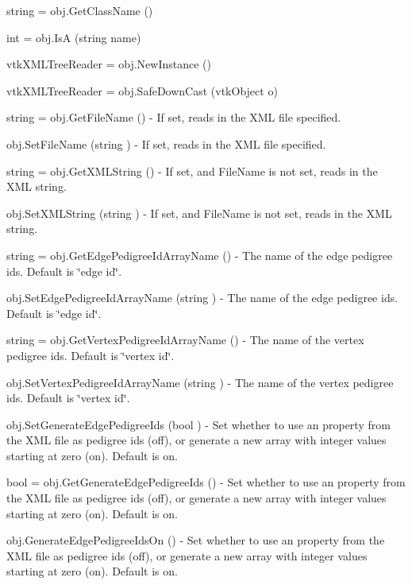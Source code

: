 \begin{DoxyItemize}
\item {\ttfamily string = obj.\-Get\-Class\-Name ()}  
\item {\ttfamily int = obj.\-Is\-A (string name)}  
\item {\ttfamily vtk\-X\-M\-L\-Tree\-Reader = obj.\-New\-Instance ()}  
\item {\ttfamily vtk\-X\-M\-L\-Tree\-Reader = obj.\-Safe\-Down\-Cast (vtk\-Object o)}  
\item {\ttfamily string = obj.\-Get\-File\-Name ()} -\/ If set, reads in the X\-M\-L file specified.  
\item {\ttfamily obj.\-Set\-File\-Name (string )} -\/ If set, reads in the X\-M\-L file specified.  
\item {\ttfamily string = obj.\-Get\-X\-M\-L\-String ()} -\/ If set, and File\-Name is not set, reads in the X\-M\-L string.  
\item {\ttfamily obj.\-Set\-X\-M\-L\-String (string )} -\/ If set, and File\-Name is not set, reads in the X\-M\-L string.  
\item {\ttfamily string = obj.\-Get\-Edge\-Pedigree\-Id\-Array\-Name ()} -\/ The name of the edge pedigree ids. Default is \char`\"{}edge id\char`\"{}.  
\item {\ttfamily obj.\-Set\-Edge\-Pedigree\-Id\-Array\-Name (string )} -\/ The name of the edge pedigree ids. Default is \char`\"{}edge id\char`\"{}.  
\item {\ttfamily string = obj.\-Get\-Vertex\-Pedigree\-Id\-Array\-Name ()} -\/ The name of the vertex pedigree ids. Default is \char`\"{}vertex id\char`\"{}.  
\item {\ttfamily obj.\-Set\-Vertex\-Pedigree\-Id\-Array\-Name (string )} -\/ The name of the vertex pedigree ids. Default is \char`\"{}vertex id\char`\"{}.  
\item {\ttfamily obj.\-Set\-Generate\-Edge\-Pedigree\-Ids (bool )} -\/ Set whether to use an property from the X\-M\-L file as pedigree ids (off), or generate a new array with integer values starting at zero (on). Default is on.  
\item {\ttfamily bool = obj.\-Get\-Generate\-Edge\-Pedigree\-Ids ()} -\/ Set whether to use an property from the X\-M\-L file as pedigree ids (off), or generate a new array with integer values starting at zero (on). Default is on.  
\item {\ttfamily obj.\-Generate\-Edge\-Pedigree\-Ids\-On ()} -\/ Set whether to use an property from the X\-M\-L file as pedigree ids (off), or generate a new array with integer values starting at zero (on). Default is on.  

\end{DoxyItemize}
